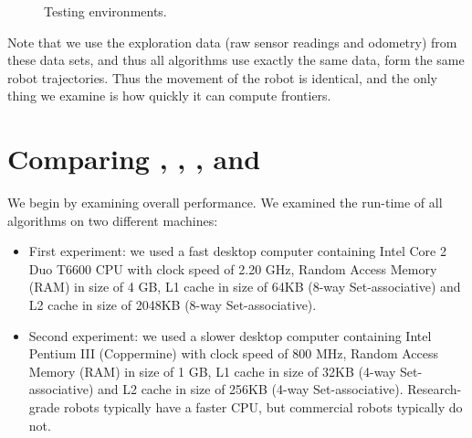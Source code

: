 \begin{figure}
{ %
 }
 \caption{Testing environments.}
 \label{fig:testing_environments}
 
\end{figure}

Note that we use the exploration data (raw sensor readings and odometry) from
these data sets, and thus all algorithms use exactly the same data, form the
same robot trajectories. Thus the movement of the robot is identical, and the
only thing we examine is how quickly it can compute frontiers.

\section{Comparing \SOTA, \FFD, \WFD, \WFDINC and \WFDIP}
\label{section:experiments_overall_compare}

We begin by examining overall performance. We examined the run-time of all
algorithms on two different machines:
\begin{itemize}
  \item First experiment: we used a fast desktop computer containing
  Intel Core 2 Duo T6600 CPU with clock speed of 2.20 GHz, Random Access
  Memory (RAM) in size of 4 GB, L1 cache in size of 64KB (8-way Set-associative)
  and L2 cache in size of 2048KB (8-way Set-associative).
\item Second experiment: we used a slower desktop computer containing
Intel Pentium III (Coppermine) with clock speed of 800 MHz, Random Access
Memory (RAM) in size of 1 GB, L1 cache in size of 32KB (4-way Set-associative)
  and L2 cache in size of 256KB (4-way Set-associative). Research-grade robots
  typically have a faster CPU, but commercial robots typically do not.
\end{itemize} 


